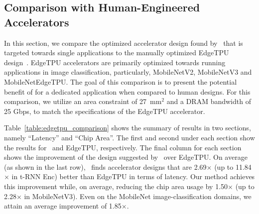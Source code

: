 \subsection{{Comparison with Human-Engineered Accelerators}}
\label{app:human_engineered}
%
{In this section, we compare the optimized accelerator design found by \primemethodname\ that is targeted towards single applications to the manually optimized EdgeTPU design~\citep{yazdanbakhsh2021evaluation,edgetpu:arxiv:2020}.
%
EdgeTPU accelerators are primarily optimized towards running applications in image classification, particularly, MobileNetV2,  MobileNetV3 and MobileNetEdgeTPU.
%
The goal of this comparison is to present the potential benefit of \primemethodname for a dedicated application when compared to human designs.
%
For this comparison, we utilize an area constraint of 27~mm$^2$ and a DRAM bandwidth of 25 Gbps, to match the specifications of the EdgeTPU accelerator.}
%

{Table~\ref{table:edgetpu_comparison} shows the summary of results in two sections, namely ``Latency'' and ``Chip Area''. The first and second under each section show the results for \primemethodname\ and EdgeTPU, respectively.
%
The final column for each section shows the improvement of the design suggested by \primemethodname\ over EdgeTPU.
%
On average (as shown in the last row), \primemethodname\ finds accelerator designs that are 2.69$\times$ (up to 11.84$\times$ in t-RNN Enc) better than EdgeTPU in terms of latency. Our method achieves this improvement while, on average, reducing the chip area usage by 1.50$\times$ (up to 2.28$\times$ in MobileNetV3). Even on the MobileNet image-classification domains, we attain an average improvement of 1.85$\times$.}

